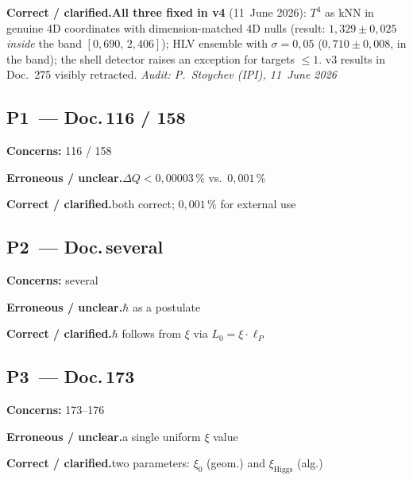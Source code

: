 \smallskip\noindent\textbf{Correct / clarified.}\quad \textbf{All three fixed in v4} (11~June 2026): $T^4$ as kNN in
  genuine 4D coordinates with dimension-matched 4D nulls (result:
  $1{,}329\pm0{,}025$ \emph{inside} the band $[0{,}690,\,2{,}406]$);
  HLV ensemble with $\sigma=0{,}05$ ($0{,}710\pm0{,}008$, in the band);
  the shell detector raises an exception for targets $\leq1$.
  v3 results in Doc.~275 visibly retracted.
  \emph{Audit: P.~Stoychev (IPI), 11~June 2026}


\medskip


\subsection*{P1~--- Doc.\,116 / 158}

\noindent\textbf{Concerns:} 116 / 158


\smallskip\noindent\textbf{Erroneous / unclear.}\quad $\Delta Q < 0{,}00003\,\%$ vs.\ $0{,}001\,\%$


\smallskip\noindent\textbf{Correct / clarified.}\quad both correct; $0{,}001\,\%$ for external use


\medskip


\subsection*{P2~--- Doc.\,several}

\noindent\textbf{Concerns:} several


\smallskip\noindent\textbf{Erroneous / unclear.}\quad $\hbar$ as a postulate


\smallskip\noindent\textbf{Correct / clarified.}\quad $\hbar$ follows from $\xi$ via $L_0 = \xi\cdot\ell_P$


\medskip


\subsection*{P3~--- Doc.\,173}

\noindent\textbf{Concerns:} 173--176


\smallskip\noindent\textbf{Erroneous / unclear.}\quad a single uniform $\xi$ value


\smallskip\noindent\textbf{Correct / clarified.}\quad two parameters: $\xi_0$ (geom.) and $\xi_{\text{Higgs}}$ (alg.)


